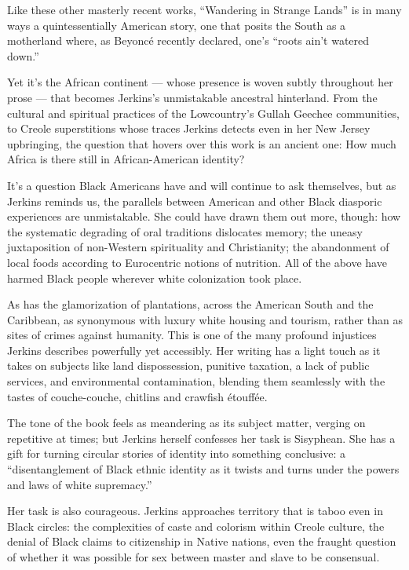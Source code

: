 Like these other masterly recent works, ``Wandering in Strange Lands''
is in many ways a quintessentially American story, one that posits the
South as a motherland where, as Beyoncé recently declared, one's ``roots
ain't watered down.''

Yet it's the African continent --- whose presence is woven subtly
throughout her prose --- that becomes Jerkins's unmistakable ancestral
hinterland. From the cultural and spiritual practices of the
Lowcountry's Gullah Geechee communities, to Creole superstitions whose
traces Jerkins detects even in her New Jersey upbringing, the question
that hovers over this work is an ancient one: How much Africa is there
still in African-American identity?

It's a question Black Americans have and will continue to ask
themselves, but as Jerkins reminds us, the parallels between American
and other Black diasporic experiences are unmistakable. She could have
drawn them out more, though: how the systematic degrading of oral
traditions dislocates memory; the uneasy juxtaposition of non-Western
spirituality and Christianity; the abandonment of local foods according
to Eurocentric notions of nutrition. All of the above have harmed Black
people wherever white colonization took place.

As has the glamorization of plantations, across the American South and
the Caribbean, as synonymous with luxury white housing and tourism,
rather than as sites of crimes against humanity. This is one of the many
profound injustices Jerkins describes powerfully yet accessibly. Her
writing has a light touch as it takes on subjects like land
dispossession, punitive taxation, a lack of public services, and
environmental contamination, blending them seamlessly with the tastes of
couche-couche, chitlins and crawfish étouffée.

The tone of the book feels as meandering as its subject matter, verging
on repetitive at times; but Jerkins herself confesses her task is
Sisyphean. She has a gift for turning circular stories of identity into
something conclusive: a ``disentanglement of Black ethnic identity as it
twists and turns under the powers and laws of white supremacy.''

Her task is also courageous. Jerkins approaches territory that is taboo
even in Black circles: the complexities of caste and colorism within
Creole culture, the denial of Black claims to citizenship in Native
nations, even the fraught question of whether it was possible for sex
between master and slave to be consensual.

